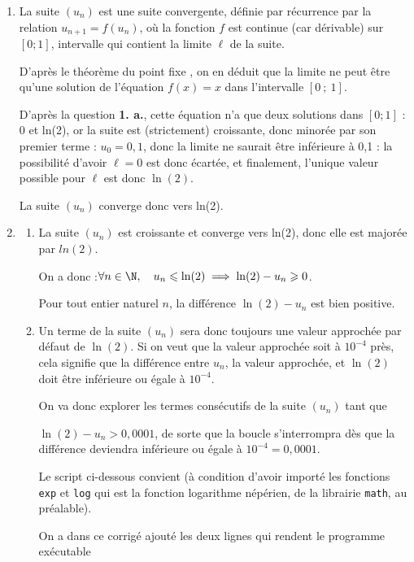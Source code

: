 \begin{enumerate}
		\item La suite $(u_n)$ est une suite convergente, définie par récurrence par la relation $u_{n+1} = f(u_n)$, où la fonction $f$ est continue (car dérivable) sur $ [0 ; 1] $, intervalle qui contient la limite $\ell$ de la suite.

D'après le théorème \og du point fixe \fg{}, on en déduit que la limite ne peut être qu'une solution de l'équation $f(x) = x$ dans l'intervalle $ [0~;~1] $.

D'après la question \textbf{1. a.}, cette équation n'a que deux solutions dans $ [0 ; 1] $ : 0 et ln(2), or la suite est (strictement) croissante, donc minorée par son premier terme : $u_0 = 0,1$, donc la limite ne saurait être inférieure à 0,1 : la possibilité d'avoir $\ell = 0$ est donc écartée, et finalement, l'unique valeur possible pour $\ell$ est donc $\ln(2)$.

La suite $(u_n)$ converge donc vers ln(2).

	\item \begin{enumerate}
		\item La suite $\left(u_n\right) $ est croissante et converge vers ln(2), donc elle est majorée par $ln (2)$.

On a donc :\quad $\forall n \in \N, \quad u_n \leqslant \ln(2) \implies \ln(2) - u_n \geqslant 0$.

Pour tout entier naturel $n$, la différence $\ln(2) - u_n$ est bien positive.

		\item Un terme de la suite $(u_n)$ sera donc toujours une valeur approchée par défaut de $\ln(2)$. Si on veut que la valeur approchée soit à $ 10^{-4} $ près, cela signifie que la différence entre $u_n$, la valeur approchée, et $\ln(2)$ doit être inférieure ou égale à $ 10^{-4} $.

On va donc explorer les termes consécutifs de la suite $(u_n)$ tant que 

$\ln(2) - u_n > 0,0001$, de sorte que la boucle s'interrompra dès que la différence deviendra inférieure ou égale à $ 10^{-4} = 0,0001 $.

Le script ci-dessous convient (à condition d'avoir importé les fonctions \texttt{exp} et \texttt{log} qui est la fonction logarithme népérien,  de la librairie \texttt{math}, au préalable).

On a dans ce corrigé ajouté les deux lignes qui rendent le programme exécutable


\end{enumerate}
\end{enumerate}
